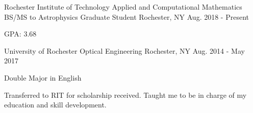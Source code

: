 \begin{cventries}
 \cventry
    {Rochester Institute of Technology}
    {Applied and Computational Mathematics BS/MS to Astrophysics Graduate Student}
    {Rochester, NY}
    {Aug. 2018 - Present}
    {
      \begin{cvitems}
       \item{GPA: 3.68}
      \end{cvitems}
   }

  \cventry
    {University of Rochester}
    {Optical Engineering}
    {Rochester, NY}
    {Aug. 2014 - May 2017}
    {
      \begin{cvitems}
        \item {Double Major in English}
        \item {Transferred to RIT for scholarship received. Taught me to be in charge of my education and skill development.}
      \end{cvitems}
   }

\end{cventries}
